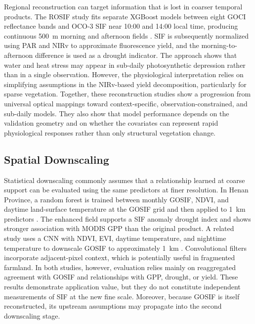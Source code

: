 Regional reconstruction can target information that is lost in coarser temporal products. The ROSIF study fits separate XGBoost models between eight GOCI reflectance bands and OCO-3 SIF near 10:00 and 14:00 local time, producing continuous 500~m morning and afternoon fields \cite{he2025tracking}. SIF is subsequently normalized using PAR and NIRv to approximate fluorescence yield, and the morning-to-afternoon difference is used as a drought indicator. The approach shows that water and heat stress may appear in sub-daily photosynthetic depression rather than in a single observation. However, the physiological interpretation relies on simplifying assumptions in the NIRv-based yield decomposition, particularly for sparse vegetation. Together, these reconstruction studies show a progression from universal optical mappings toward context-specific, observation-constrained, and sub-daily models. They also show that model performance depends on the validation geometry and on whether the covariates can represent rapid physiological responses rather than only structural vegetation change.

\subsection{Spatial Downscaling}

Statistical downscaling commonly assumes that a relationship learned at coarse support can be evaluated using the same predictors at finer resolution. In Henan Province, a random forest is trained between monthly GOSIF, NDVI, and daytime land-surface temperature at the GOSIF grid and then applied to 1~km predictors \cite{zhang2024spatial}. The enhanced field supports a SIF anomaly drought index and shows stronger association with MODIS GPP than the original product. A related study uses a CNN with NDVI, EVI, daytime temperature, and nighttime temperature to downscale GOSIF to approximately 1~km \cite{zhang2020downscaling}. Convolutional filters incorporate adjacent-pixel context, which is potentially useful in fragmented farmland. In both studies, however, evaluation relies mainly on reaggregated agreement with GOSIF and relationships with GPP, drought, or yield. These results demonstrate application value, but they do not constitute independent measurements of SIF at the new fine scale. Moreover, because GOSIF is itself reconstructed, its upstream assumptions may propagate into the second downscaling stage.

